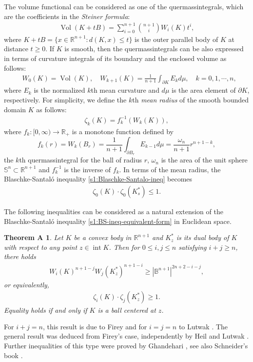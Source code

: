 \documentclass[11pt,reqno]{amsart}
\newtheorem*{thmA}{Theorem A}
\theoremstyle{definition}
\theoremstyle{remark}
\numberwithin{equation}{section}
\renewcommand{\(}{\left(}
\renewcommand{\)}{\right)}
\renewcommand{\~}{\tilde}
\renewcommand{\-}{\overline}
\newcommand{\ra}{\rightarrow}
\newcommand{\Vol}{\operatorname{Vol}}
\begin{document}
The volume functional can be considered as one of the quermassintegrals, which are the coefficients in the {\em Steiner formula}:
\begin{align*}
\Vol(K+tB)=\sum_{i=0}^{n+1}\binom{n+1}{i}W_i(K)t^i,
\end{align*}
where $K+tB=\{ x\in \mathbb R^{n+1} : d(K,x)\leq t \}$ is the outer parallel body of $K$ at distance $t\geq 0$. If $K$ is smooth, then the quermassintegrals can be also expressed in terms of curvature integrals of its boundary and the enclosed volume as follows:
\begin{equation}\label{s1:quermassintegral-Euclidean-space}
\begin{split}
&W_0(K)=\operatorname{Vol}(K), \quad W_{k+1}(K)=\frac{1}{n+1}\int_{\partial K}E_{k}d\mu, \quad k=0,1,\cdots,n,
\end{split}
\end{equation}
where $E_k$ is the normalized $k$th mean curvature and $d\mu$ is the area element of $\partial K$, respectively. For simplicity, we define the $k$th {\em mean radius} of the smooth bounded domain $K$ as follows:
\begin{align}\label{s1:def-mean-radius}
\zeta_k(K)=f_k^{-1}(W_k(K)),
\end{align}
where $f_k:[0,\infty)\ra \mathbb R_{+}$ is a monotone function defined by
$$
f_k(r)=W_k(B_r)=\frac{1}{n+1}\int_{\partial B_r}E_{k-1} d\mu=\frac{\omega_n}{n+1}r^{n+1-k},
$$
the $k$th quermassintegral for the ball of radius $r$, $\omega_n$ is the area of the unit sphere $\mathbb S^n\subset \mathbb R^{n+1}$ and $f_k^{-1}$ is the inverse of $f_k$. In terms of the mean radius, the Blaschke-Santal\'o inequality \eqref{s1:Blaschke-Santalo-ineq} becomes
\begin{align}\label{s1:BS-ineq-equivalent-form}
\zeta_0(K) \cdot \zeta_0(K_s^\ast) \leq 1.
\end{align}

The following inequalities can be considered as a natural extension of the Blaschke-Santal\'o inequality \eqref{s1:BS-ineq-equivalent-form} in Euclidean space.
\begin{thmA}
	Let $K$ be a convex body in $\mathbb R^{n+1}$ and $K_z^\ast$ is its dual body of $K$ with respect to any point $z\in \operatorname{int}K$. Then for $0\leq i,j\leq n$ satisfying $i+j\geq n$, there holds
	\begin{align}\label{s1:Firey-ineq}
	W_i(K)^{n+1-j} W_j(K_z^\ast)^{n+1-i} \geq |\mathbb B^{n+1}|^{2n+2-i-j},
	\end{align}
	or equivalently, 
	\begin{align}\label{s1:Firey-ineq-equivalent-form}
	\zeta_{i}(K) \cdot \zeta_{j}(K_z^\ast) \geq 1.
	\end{align}	
	Equality holds if and only if $K$ is a ball centered at $z$.
\end{thmA}
For $i+j=n$, this result is due to Firey \cite{Firey1973} and for $i=j=n$ to Lutwak \cite{Lutwak1975}. The general result was deduced from Firey's case, independently by Heil \cite{Heil1976} and Lutwak \cite{Lutwak1976}. Further inequalities of this type were proved by Ghandehari \cite{Ghandehari1991}, see also Schneider's book \cite[P. 393]{Schneider2014}.
\end{document}
